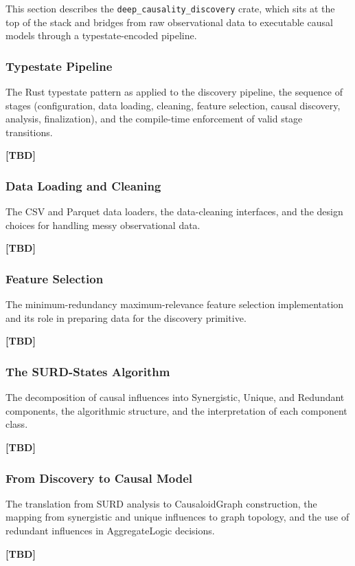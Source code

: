 This section describes the \texttt{deep\_causality\_discovery} crate, which sits at the top of the stack and bridges from raw observational data to executable causal models through a typestate-encoded pipeline.
 
\subsubsection{Typestate Pipeline}
The Rust typestate pattern as applied to the discovery pipeline, the sequence of stages (configuration, data loading, cleaning, feature selection, causal discovery, analysis, finalization), and the compile-time enforcement of valid stage transitions.
 
\textbf{[TBD]}
 
\subsubsection{Data Loading and Cleaning}
The CSV and Parquet data loaders, the data-cleaning interfaces, and the design choices for handling messy observational data.
 
\textbf{[TBD]}
 
\subsubsection{Feature Selection}
The minimum-redundancy maximum-relevance feature selection implementation and its role in preparing data for the discovery primitive.
 
\textbf{[TBD]}
 
\subsubsection{The SURD-States Algorithm}
The decomposition of causal influences into Synergistic, Unique, and Redundant components, the algorithmic structure, and the interpretation of each component class.
 
\textbf{[TBD]}
 
\subsubsection{From Discovery to Causal Model}
The translation from SURD analysis to CausaloidGraph construction, the mapping from synergistic and unique influences to graph topology, and the use of redundant influences in AggregateLogic decisions.
 
\textbf{[TBD]}
 
